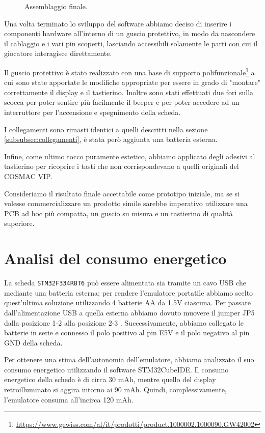 \documentclass[a4paper]{article}
\begin{document}
\begin{figure}[h!t]
\begin{center}
    \end{center}
    \caption{Assemblaggio finale.}
    \label{fig:assemblaggio}
\end{figure}

Una volta terminato lo sviluppo del software abbiamo deciso di inserire i componenti hardware
all'interno di un guscio protettivo, in modo da nascondere il cablaggio e i vari pin scoperti,
lasciando accessibili solamente le parti con cui il giocatore interagisce direttamente.

Il guscio protettivo è stato realizzato con una base di supporto
polifunzionale\footnote{\url{https://www.gewiss.com/al/it/prodotti/product.1000002.1000090.GW42002}}
a cui sono state apportate le modifiche appropriate per essere in grado di "montare" correttamente
il display e il tastierino. Inoltre sono stati effettuati due fori sulla scocca per poter sentire
più facilmente il beeper e per poter accedere ad un interruttore per l'accensione e spegnimento
della scheda.

I collegamenti sono rimasti identici a quelli descritti nella sezione
\ref{subsubsec:collegamenti}, è stata però aggiunta una batteria esterna.

Infine, come ultimo tocco puramente estetico, abbiamo applicato degli adesivi al tastierino
per ricoprire i tasti che non corrispondevano a quelli originali del COSMAC VIP.

Consideriamo il risultato finale accettabile come prototipo iniziale, ma se si volesse
commercializzare un prodotto simile sarebbe imperativo utilizzare una PCB ad hoc più compatta,
un guscio su misura e un tastierino di qualità superiore.

\clearpage

\section{Analisi del consumo energetico}

La scheda \texttt{STM32F334R8T6} può essere alimentata sia tramite un cavo USB che mediante
una batteria esterna; per rendere l'emulatore portatile abbiamo scelto quest'ultima
soluzione utilizzando 4 batterie AA da 1.5V ciascuna. Per passare dall'alimentazione USB a
quella esterna abbiamo dovuto muovere il jumper JP5 dalla posizione 1-2 alla posizione 2-3
\cite{stm32:usermanual}. Successivamente, abbiamo collegato le batterie in serie e connesso
il polo positivo al pin E5V e il polo negativo al pin GND della scheda.

Per ottenere una stima dell'autonomia dell'emulatore, abbiamo analizzato il suo consumo
energetico utilizzando il software STM32CubeIDE. Il consumo energetico della scheda è di
circa 30 mAh, mentre quello del display retroilluminato si aggira intorno ai 90 mAh.
Quindi, complessivamente, l'emulatore consuma all'incirca 120 mAh.
\end{document}
